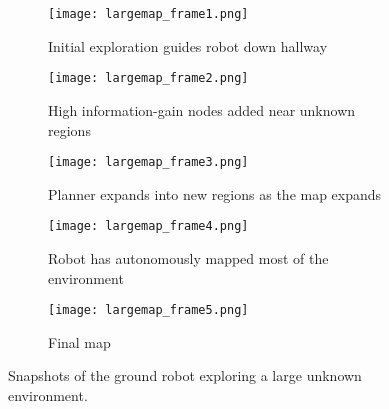 \begin{figure*}[t]
	\centering
	\begin{subfigure}{0.49\textwidth}
	\centering
	\texttt{[image: largemap\_frame1.png]}
	\caption{Initial exploration guides robot down hallway\label{fig:largemap_frame1}}
	\end{subfigure}
	\begin{subfigure}{0.49\textwidth}
	\centering
	\texttt{[image: largemap\_frame2.png]}
	\caption{High information-gain nodes added near unknown regions\label{fig:largemap_frame2}}
	\end{subfigure}
	
	\vspace*{0.2in}
	
	\begin{subfigure}{0.49\textwidth}
	\centering
	\texttt{[image: largemap\_frame3.png]}
	\caption{Planner expands into new regions as the map expands \label{fig:largemap_frame3}}
	\end{subfigure}
	\begin{subfigure}{0.49\textwidth}
	\centering
	\texttt{[image: largemap\_frame4.png]}
	\caption{Robot has autonomously mapped most of the environment \label{fig:largemap_frame4}}
	\end{subfigure}
	
	\vspace*{0.2in}

	\begin{subfigure}{0.6\textwidth}
	\centering
	\texttt{[image: largemap\_frame5.png]}
	\caption{Final map \label{fig:largemap_frame5}}
	\end{subfigure}
	
	\caption{Snapshots of the ground robot exploring a large unknown environment. \label{fig:largemap_snapshots}}
\end{figure*}